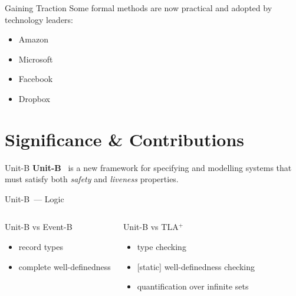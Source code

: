 \documentclass[11pt]{beamer}
\newcommand{\unitb}{Unit-B\xspace}
\newcommand{\eventb}{Event-B\xspace}
\newcommand{\tla}{TLA${}^+$\xspace}
\begin{document}
\begin{frame}[fragile]{Gaining Traction}
  Some formal methods are now practical and adopted by technology leaders:
  \begin{itemize}
  \item Amazon
  \item Microsoft
  \item Facebook
  \item Dropbox
  \end{itemize}
\end{frame}


\section{Significance \& Contributions}

\begin{frame}[fragile]{\unitb}
  \textbf{\unitb}~\cite{SoSyM/Hudon/Hoang/Ostroff15} is a new
  framework for specifying and modelling systems that must satisfy
  both \emph{safety} and \emph{liveness} properties.
\end{frame}

\begin{frame}[fragile]{\unitb\ --- Logic}
  \begin{columns}[T,onlytextwidth]
      \begin{block}{\unitb vs \eventb~\cite{DBLP:books/daglib/0024570}}
        \begin{itemize}
          \item record types
          \item complete well-definedness
      \end{itemize}
      \end{block}
      \pause


      \begin{block}{\unitb vs \tla~\cite{DBLP:books/aw/Lamport2002}}
        \begin{itemize}
          \item type checking
          \item {[static]} well-definedness checking
          \item quantification over infinite sets\footnotemark
        \end{itemize}
      \end{block}
  \end{columns}
\end{frame}
\end{document}
